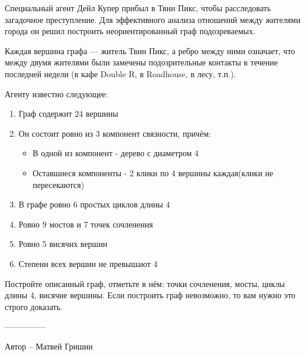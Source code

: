 \question
Специальный агент Дейл Купер прибыл в Твин Пикс, чтобы расследовать загадочное преступление. Для эффективного анализа отношений между жителями города он решил построить неориентированный граф подозреваемых.

Каждая вершина графа — житель Твин Пикс, а ребро между ними означает, что между двумя жителями были замечены подозрительные контакты в течение последней недели (в кафе Double R, в Roadhouse, в лесу, т.п.).

Агенту известно следующее:

\begin{enumerate}
\item Граф содержит 24 вершины
\item Он состоит ровно из 3 компонент связности, причём:
\begin{itemize}
    \item В одной из компонент - дерево с диаметром 4
    \item Оставшиеся компоненты - 2 клики по 4 вершины каждая(клики не пересекаются)
\end{itemize}
\item В графе ровно 6 простых циклов длины 4
\item Ровно 9 мостов и 7 точек сочленения
\item Ровно 5 висячих вершин
\item Степени всех вершин не превышают 4
\end{enumerate}

Постройте описанный граф, отметьте в нём: точки сочленения, мосты, циклы длины 4, висячие вершины.
Если построить граф невозможно, то вам нужно это строго доказать.

---------------

Автор -- Матвей Гришин
